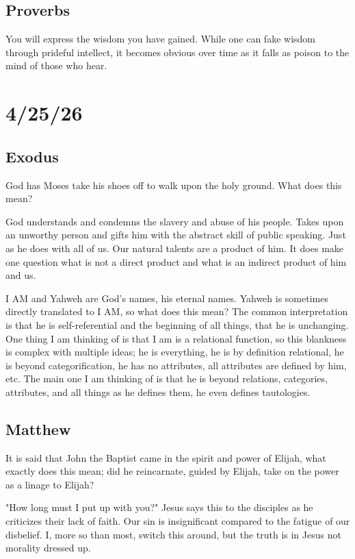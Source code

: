 \subsection{Proverbs}
You will express the wisdom you have gained. While one can fake wisdom through prideful intellect, it becomes obvious over time as it falls as poison to the mind of those who hear.

\section{4/25/26}
\subsection{Exodus}
God has Moses take his shoes off to walk upon the holy ground. What does this mean?

God understands and condemns the slavery and abuse of his people. Takes upon an unworthy person and gifts him with the abstract skill of public speaking. Just as he does with all of us. Our natural talents are a product of him. It does make one question what is not a direct product and what is an indirect product of him and us.

I AM and Yahweh are God's names, his eternal names. Yahweh is sometimes directly translated to I AM, so what does this mean? The common interpretation is that he is self-referential and the beginning of all things, that he is unchanging. One thing I am thinking of is that I am is a relational function, so this blankness is complex with multiple ideas; he is everything, he is by definition relational, he is beyond categorification, he has no attributes, all attributes are defined by him, etc. The main one I am thinking of is that he is beyond relations, categories, attributes, and all things as he defines them, he even defines tautologies.

\subsection{Matthew}
It is said that John the Baptist came in the spirit and power of Elijah, what exactly does this mean; did he reincarnate, guided by Elijah, take on the power as a linage to Elijah?

"How long must I put up with you?" Jesus says this to the disciples as he criticizes their lack of faith. Our sin is insignificant compared to the fatigue of our disbelief. I, more so than most, switch this around, but the truth is in Jesus not morality dressed up.

